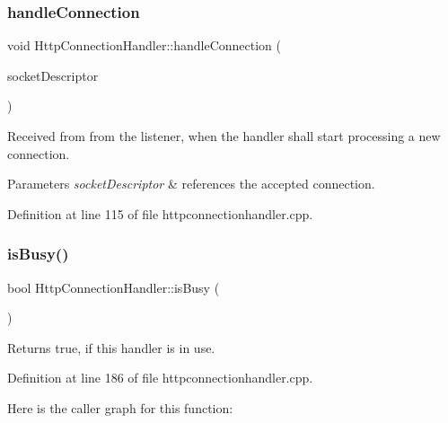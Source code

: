 \subsubsection{\texorpdfstring{handle\+Connection}{handleConnection}}
{\footnotesize\ttfamily void Http\+Connection\+Handler\+::handle\+Connection (\begin{DoxyParamCaption}\item[{\mbox{\hyperlink{httpconnectionhandler_8h_a9884f8c3364a6510f6118c5336fd0458}{t\+Socket\+Descriptor}}}]{socket\+Descriptor }\end{DoxyParamCaption})\hspace{0.3cm}{\ttfamily [slot]}}

Received from from the listener, when the handler shall start processing a new connection. 
\begin{DoxyParams}{Parameters}
{\em socket\+Descriptor} & references the accepted connection. \\
\hline
\end{DoxyParams}


Definition at line 115 of file httpconnectionhandler.\+cpp.

\mbox{\label{classstefanfrings_1_1_http_connection_handler_a3ce005483981faf3b1b5cabf1fe6c24f}} 
\subsubsection{\texorpdfstring{is\+Busy()}{isBusy()}}
{\footnotesize\ttfamily bool Http\+Connection\+Handler\+::is\+Busy (\begin{DoxyParamCaption}{ }\end{DoxyParamCaption})}

Returns true, if this handler is in use. 

Definition at line 186 of file httpconnectionhandler.\+cpp.

Here is the caller graph for this function\+:
\mbox{\label{classstefanfrings_1_1_http_connection_handler_a7fcffe53d6604499fbb298bbc0fa453e}} 
